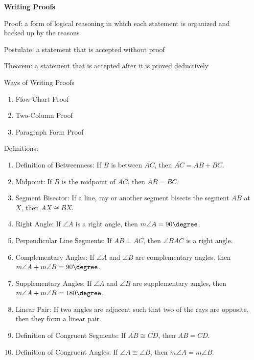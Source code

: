 
\begin{center}
\textbf{Writing Proofs 
}
\end{center}

\vspce

Proof: a form of logical reasoning in which each statement is organized and backed up by the reasons 
\vspce 

Postulate: a statement that is accepted without proof 

\vspce 

Theorem: a statement that is accepted after it is proved deductively

\vspce 

Ways of Writing Proofs 
\begin{enumerate}[label = \arabic*. ]
\item \hspce Flow-Chart Proof
\vspce
\item \hspce Two-Column Proof
\vspce
\item \hspce Paragraph Form Proof
\end{enumerate} 

\vspce 
\newpage
Definitions: 
\begin{enumerate}[label = \arabic*. ]
\item Definition of Betweenness: If $B$ is between $\overline{AC}$, then $\overline{AC}=AB + BC $.
\item Midpoint: If $B$ is the midpoint of $\overline{AC}$, then $AB = BC$.
\item Segment Bisector: If a line, ray or another segment bisects the segment $AB$ at $X$, then $AX \cong BX$.
\item Right Angle: If $\angle{A}$ is a right angle, then $m\angle{A}= 90\degree $.
\item Perpendicular Line Segments: If $\overline{AB}\perp \overline{AC}$, then $\angle{BAC}$ is a right angle.
\item Complementary Angles: If $\angle{A}$ and $\angle{B}$ are complementary angles, then $m\angle{A} + m\angle{B} = 90\degree$.
\item Supplementary Angles: If $\angle{A}$ and $\angle{B}$ are supplementary angles, then $m\angle{A} + m\angle{B} = 180\degree$.
\item Linear Pair: If two angles are adjacent such that two of the rays are opposite, then they form a linear pair.
\item Definition of Congruent Segments: If $\overline{AB}\cong\overline{CD}$, then $AB = CD$. 
\item Definition of Congruent Angles: If $\angle{A} \cong \angle{B}$, then $m\angle{A} = m\angle{B}$. 
\end{enumerate} 

